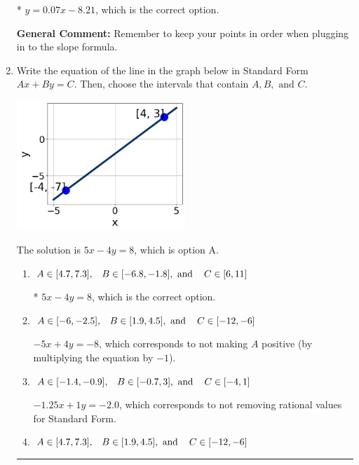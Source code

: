 \documentclass{extbook}[14pt]
\newcommand{\litem}[1]{\item #1

\rule{\textwidth}{0.4pt}}
\begin{document}
\begin{enumerate}
{\begin{enumerate}[label=\Alph*.]
* $y = 0.07x -8.21$, which is the correct option.
\end{enumerate}

\textbf{General Comment:} Remember to keep your points in order when plugging in to the slope formula.
}
\litem{
Write the equation of the line in the graph below in Standard Form $Ax+By=C$. Then, choose the intervals that contain $A, B, \text{ and } C$.

\begin{center}
    \includegraphics[width=0.5\textwidth]{../Figures/linearGraphToStandardB.png}
\end{center}


The solution is \( 5x - 4y = 8 \), which is option A.\begin{enumerate}[label=\Alph*.]
\item \( A \in [4.7, 7.3], \hspace{3mm} B \in [-6.8, -1.8], \text{ and } \hspace{3mm} C \in [6, 11] \)

* $5x - 4y = 8$, which is the correct option.
\item \( A \in [-6, -2.5], \hspace{3mm} B \in [1.9, 4.5], \text{ and } \hspace{3mm} C \in [-12, -6] \)

 $-5x + 4y = -8$, which corresponds to not making $A$ positive (by multiplying the equation by $-1$).
\item \( A \in [-1.4, -0.9], \hspace{3mm} B \in [-0.7, 3], \text{ and } \hspace{3mm} C \in [-4, 1] \)

 $-1.25x + 1y = -2.0$, which corresponds to not removing rational values for Standard Form.
\item \( A \in [4.7, 7.3], \hspace{3mm} B \in [1.9, 4.5], \text{ and } \hspace{3mm} C \in [-12, -6] \)


\end{enumerate}}
\end{enumerate}
\end{document}

